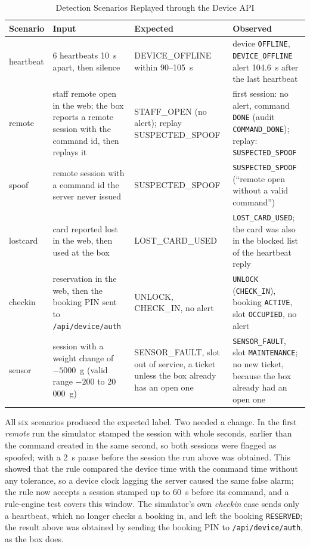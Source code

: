 \documentclass[conference, onecolumn]{IEEEtran}
\begin{document}
\begin{table}[H]
\renewcommand{\arraystretch}{1.3}
\centering
\caption{Detection Scenarios Replayed through the Device API}
\label{tab:scen}
\begin{tabular}{l p{5.0cm} p{3.0cm} p{6.0cm}}
\hline
\textbf{Scenario} & \textbf{Input} & \textbf{Expected} & \textbf{Observed} \\
\hline
heartbeat & 6 heartbeats 10~s apart, then silence & DEVICE\_OFFLINE within 90--105~s & device \texttt{OFFLINE}, \texttt{DEVICE\_OFFLINE} alert 104.6~s after the last heartbeat \\
remote    & staff remote open in the web; the box reports a remote session with the command id, then replays it & STAFF\_OPEN (no alert); replay SUSPECTED\_SPOOF & first session: no alert, command \texttt{DONE} (audit \texttt{COMMAND\_DONE}); replay: \texttt{SUSPECTED\_SPOOF} \\
spoof     & remote session with a command id the server never issued & SUSPECTED\_SPOOF & \texttt{SUSPECTED\_SPOOF} (``remote open without a valid command'') \\
lostcard  & card reported lost in the web, then used at the box & LOST\_CARD\_USED & \texttt{LOST\_CARD\_USED}; the card was also in the blocked list of the heartbeat reply \\
checkin   & reservation in the web, then the booking PIN sent to \texttt{/api/device/auth} & UNLOCK, CHECK\_IN, no alert & \texttt{UNLOCK} (\texttt{CHECK\_IN}), booking \texttt{ACTIVE}, slot \texttt{OCCUPIED}, no alert \\
sensor    & session with a weight change of $-5000$~g (valid range $-200$ to 20\,000~g) & SENSOR\_FAULT, slot out of service, a ticket unless the box already has an open one & \texttt{SENSOR\_FAULT}, slot \texttt{MAINTENANCE}; no new ticket, because the box already had an open one \\
\hline
\end{tabular}
\end{table}

All six scenarios produced the expected label. Two needed a change. In the first \emph{remote} run the simulator
stamped the session with whole seconds, earlier than the command created in the same second, so both sessions were
flagged as spoofed; with a 2~s pause before the session the run above was obtained. This showed that the rule
compared the device time with the command time without any tolerance, so a device clock lagging the server caused the
same false alarm; the rule now accepts a session stamped up to 60~s before its command, and a rule-engine test covers
this window.
The simulator's own \emph{checkin} case sends only a heartbeat, which no longer checks a booking in, and left the
booking \texttt{RESERVED}; the result above was obtained by sending the booking PIN to \texttt{/api/device/auth}, as
the box does.
\end{document}
